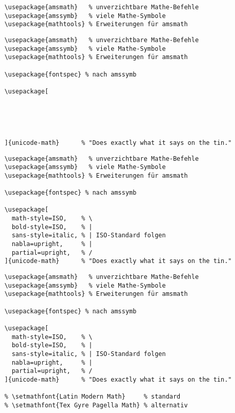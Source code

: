 \newsavebox{\mathfontsone}
\newsavebox{\mathfontstwo}
\newsavebox{\mathfontsthree}
\newsavebox{\mathfontsfour}

\begin{lrbox}{\mathfontsone}
  \begin{lstlisting}
    \usepackage{amsmath}   % unverzichtbare Mathe-Befehle
    \usepackage{amssymb}   % viele Mathe-Symbole
    \usepackage{mathtools} % Erweiterungen für amsmath
  \end{lstlisting}
\end{lrbox}

\begin{lrbox}{\mathfontstwo}
  \begin{lstlisting}
    \usepackage{amsmath}   % unverzichtbare Mathe-Befehle
    \usepackage{amssymb}   % viele Mathe-Symbole
    \usepackage{mathtools} % Erweiterungen für amsmath

    \usepackage{fontspec} % nach amssymb

    \usepackage[





    ]{unicode-math}      % "Does exactly what it says on the tin."
  \end{lstlisting}
\end{lrbox}

\begin{lrbox}{\mathfontsthree}
  \begin{lstlisting}
    \usepackage{amsmath}   % unverzichtbare Mathe-Befehle
    \usepackage{amssymb}   % viele Mathe-Symbole
    \usepackage{mathtools} % Erweiterungen für amsmath

    \usepackage{fontspec} % nach amssymb

    \usepackage[
      math-style=ISO,    % \
      bold-style=ISO,    % |
      sans-style=italic, % | ISO-Standard folgen
      nabla=upright,     % |
      partial=upright,   % /
    ]{unicode-math}      % "Does exactly what it says on the tin."
  \end{lstlisting}
\end{lrbox}

\begin{lrbox}{\mathfontsfour}
  \begin{lstlisting}
    \usepackage{amsmath}   % unverzichtbare Mathe-Befehle
    \usepackage{amssymb}   % viele Mathe-Symbole
    \usepackage{mathtools} % Erweiterungen für amsmath

    \usepackage{fontspec} % nach amssymb

    \usepackage[
      math-style=ISO,    % \
      bold-style=ISO,    % |
      sans-style=italic, % | ISO-Standard folgen
      nabla=upright,     % |
      partial=upright,   % /
    ]{unicode-math}      % "Does exactly what it says on the tin."

    % \setmathfont{Latin Modern Math}     % standard
    % \setmathfont{Tex Gyre Pagella Math} % alternativ
  \end{lstlisting}
\end{lrbox}

